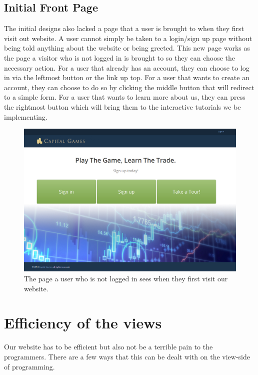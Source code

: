 \subsection{Initial Front Page}
The initial designs also lacked a page that a user is brought to when they first visit out website. A user cannot simply be taken to a login/sign up page without being told anything about the website or being greeted. This new page works as the page a visitor who is not logged in is brought to so they can choose the necessary action. For a user that already has an account, they can choose to log in via the leftmost button or the link up top. For a user that wants to create an account, they can choose to do so by clicking the middle button that will redirect to a simple form. For a user that wants to learn more about us, they can press the rightmost button which will bring them to the interactive tutorials we be implementing. 
\begin{figure}[H]
\centering
\includegraphics[width=5.5in]{./mockups/JPEG/initialpage.jpg}
\caption{The page a user who is not logged in sees when they first visit our website.}
\end{figure}


\section{Efficiency of the views}
Our website has to be efficient but also not be a terrible pain to the programmers. There are a few ways that this can be dealt with on the view-side of programming.

